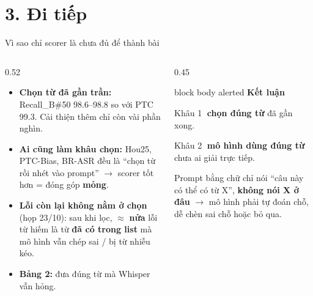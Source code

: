 \documentclass[aspectratio=169,xcolor=table]{beamer}
\newcommand{\bad}[1]{\textcolor{RiskRed}{\textbf{#1}}}
\newcommand{\ra}{$\rightarrow$}
\begin{document}
\section{3. Đi tiếp}
\begin{frame}{Vì sao chỉ scorer là chưa đủ để thành bài}
\begin{columns}[T]
\begin{column}{0.52\textwidth}
\small
\begin{itemize}\itemsep4pt
\item \textbf{Chọn từ đã gần trần:} Recall\_B\#50 98.6--98.8 so với PTC 99.3. Cải thiện thêm chỉ còn vài phần nghìn.
\item \textbf{Ai cũng làm khâu chọn:} Hou25, PTC-Bias, BR-ASR đều là ``chọn từ rồi nhét vào prompt'' \ra{} scorer tốt hơn = đóng góp \bad{mỏng}.
\item \textbf{Lỗi còn lại không nằm ở chọn} (họp 23/10): sau khi lọc, $\approx$ \textbf{nửa} lỗi từ hiếm là từ \textbf{đã có trong list} mà mô hình vẫn chép sai / bị từ nhiễu kéo.
\item \textbf{Bảng 2:} đưa đúng từ mà Whisper vẫn hỏng.
\end{itemize}
\end{column}
\begin{column}{0.45\textwidth}
\begin{beamercolorbox}[sep=0.55em,rounded=true]{block body alerted}
\textbf{Kết luận}\par\small
Khâu \textcircled{\scriptsize 1} \textbf{chọn đúng từ} đã gần xong.\par
Khâu \textcircled{\scriptsize 2} \textbf{mô hình dùng đúng từ} chưa ai giải trực tiếp.\par\vspace{0.1cm}
Prompt bằng chữ chỉ nói ``câu này có thể có từ X'', \textbf{không nói X ở đâu} \ra{} mô hình phải tự đoán chỗ, dễ chèn sai chỗ hoặc bỏ qua.
\end{beamercolorbox}
\end{column}
\end{columns}
\end{frame}
\end{document}
